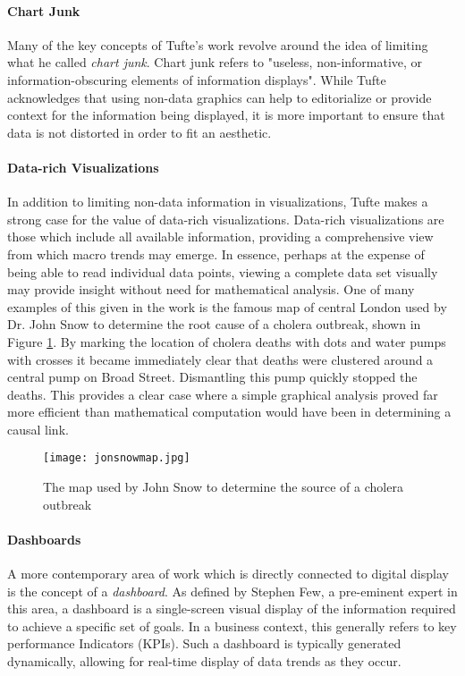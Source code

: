 \paragraph{Chart Junk}
Many of the key concepts of Tufte's work revolve around the idea of limiting what he called \emph{chart junk}. Chart junk refers to "useless, non-informative, or information-obscuring elements of information displays"\cite{Tufle1983}. While Tufte acknowledges that using non-data graphics can help to editorialize or provide context for the information being displayed,  it is more important to ensure that data is not distorted in order to fit an aesthetic. 

\paragraph{Data-rich Visualizations}
In addition to limiting non-data information in visualizations, Tufte makes a strong case for the value of data-rich visualizations. Data-rich visualizations are those which include all available information, providing a comprehensive view from which macro trends may emerge. In essence, perhaps at the expense of being able to read individual data points, viewing a complete data set visually may provide insight without need for mathematical analysis. One of many examples of this given in the work is the famous map of central London used by Dr. John Snow to determine the root cause of a cholera outbreak, shown in Figure \ref{fig:snowmap}. By marking the location of cholera deaths with dots and water pumps with crosses it became immediately clear that deaths were clustered around a central pump on Broad Street. Dismantling this pump quickly stopped the deaths. This provides a clear case where a simple graphical analysis proved far more efficient than mathematical computation would have been in determining a causal link.

\begin{figure}
	\centering
	\label{fig:snowmap}
	\texttt{[image: jonsnowmap.jpg]}
	\caption{The map used by John Snow to determine the source of a cholera outbreak \cite{Tufte1983}}
\end{figure}

\paragraph{Dashboards}
A more contemporary area of work which is directly connected to digital display is the concept of a \emph{dashboard}. As defined by Stephen Few, a pre-eminent expert in this area, a dashboard is a single-screen visual display of the information required to achieve a specific set of goals. In a business context, this generally refers to key performance Indicators (KPIs). Such a dashboard is typically generated dynamically, allowing for real-time display of data trends as they occur. 


